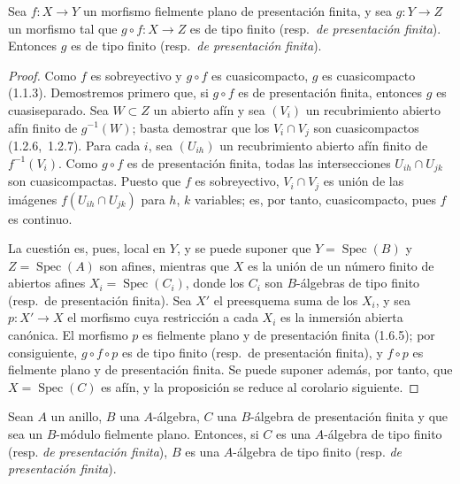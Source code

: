 \begin{proposition}[11.3.16]
\label{IV.11.3.16}
Sea $f:X\to Y$ un morfismo fielmente plano de presentación finita, y sea $g:Y\to Z$ un morfismo tal que $g\circ f:X\to Z$ es de tipo finito \textup{(resp.\ \emph{de presentación finita})}. Entonces $g$ es de tipo finito \textup{(resp.\ \emph{de presentación finita})}.
\end{proposition}

\begin{proof}
Como $f$ es sobreyectivo y $g\circ f$ es cuasicompacto, $g$ es cuasicompacto (1.1.3). Demostremos primero que, si $g\circ f$ es de presentación finita, entonces $g$ es cuasiseparado. Sea $W\subset Z$ un abierto afín y sea $(V_i)$ un recubrimiento abierto afín finito de $g^{-1}(W)$; basta demostrar que los $V_i\cap V_j$ son cuasicompactos (1.2.6,\ 1.2.7). Para cada $i$, sea $(U_{ih})$ un recubrimiento abierto afín finito de $f^{-1}(V_i)$. Como $g\circ f$ es de presentación finita, todas las intersecciones $U_{ih}\cap U_{jk}$ son cuasicompactas. Puesto que $f$ es sobreyectivo, $V_i\cap V_j$ es unión de las imágenes $f(U_{ih}\cap U_{jk})$ para $h$, $k$ variables; es, por tanto, cuasicompacto, pues $f$ es continuo.

La cuestión es, pues, local en $Y$, y se puede suponer que $Y=\operatorname{Spec}(B)$ y $Z=\operatorname{Spec}(A)$ son afines, mientras que $X$ es la unión de un número finito de abiertos afines $X_i=\operatorname{Spec}(C_i)$, donde los $C_i$ son $B$-álgebras de tipo finito (resp.\ de presentación finita). Sea $X'$ el preesquema suma de los $X_i$, y sea $p:X'\to X$ el morfismo cuya restricción a cada $X_i$ es la inmersión abierta canónica. El morfismo $p$ es fielmente plano y de presentación finita (1.6.5); por consiguiente, $g\circ f\circ p$ es de tipo finito (resp.\ de presentación finita), y $f\circ p$ es fielmente plano y de presentación finita. Se puede suponer además, por tanto, que $X=\operatorname{Spec}(C)$ es afín, y la proposición se reduce al corolario siguiente.
\end{proof}

\begin{corollary}[11.3.17]
\label{IV.11.3.17}
Sean $A$ un anillo, $B$ una $A$-álgebra, $C$ una $B$-álgebra de presentación
finita y que sea un $B$-módulo fielmente plano. Entonces, si $C$ es una
$A$-álgebra de tipo finito \textup{(resp. \emph{de presentación finita})}, $B$ es una
$A$-álgebra de tipo finito \textup{(resp. \emph{de presentación finita})}.
\end{corollary}

